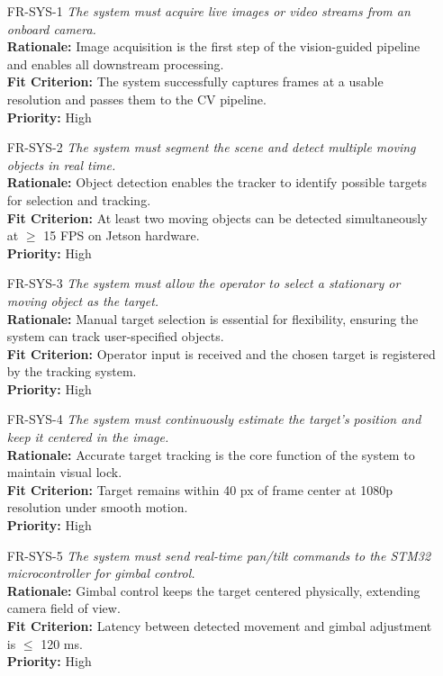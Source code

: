 \documentclass[12pt]{article}
\begin{document}
\begin{itemize}

  \item[FR-SYS-1] \emph{The system must acquire live images or video streams from an onboard camera.}\\[2mm]
    {\bf Rationale:} Image acquisition is the first step of the vision-guided pipeline and enables all downstream processing.\\
    {\bf Fit Criterion:} The system successfully captures frames at a usable resolution and passes them to the CV pipeline.\\
    {\bf Priority:} High

  \item[FR-SYS-2] \emph{The system must segment the scene and detect multiple moving objects in real time.}\\[2mm]
    {\bf Rationale:} Object detection enables the tracker to identify possible targets for selection and tracking.\\
    {\bf Fit Criterion:} At least two moving objects can be detected simultaneously at $\geq$ 15 FPS on Jetson hardware.\\
    {\bf Priority:} High

  \item[FR-SYS-3] \emph{The system must allow the operator to select a stationary or moving object as the target.}\\[2mm]
    {\bf Rationale:} Manual target selection is essential for flexibility, ensuring the system can track user-specified objects.\\
    {\bf Fit Criterion:} Operator input is received and the chosen target is registered by the tracking system.\\
    {\bf Priority:} High

  \item[FR-SYS-4] \emph{The system must continuously estimate the target’s position and keep it centered in the image.}\\[2mm]
    {\bf Rationale:} Accurate target tracking is the core function of the system to maintain visual lock.\\
    {\bf Fit Criterion:} Target remains within 40 px of frame center at 1080p resolution under smooth motion.\\
    {\bf Priority:} High

  \item[FR-SYS-5] \emph{The system must send real-time pan/tilt commands to the STM32 microcontroller for gimbal control.}\\[2mm]
    {\bf Rationale:} Gimbal control keeps the target centered physically, extending camera field of view.\\
    {\bf Fit Criterion:} Latency between detected movement and gimbal adjustment is $\leq$ 120 ms.\\
    {\bf Priority:} High


\end{itemize}
\end{document}
